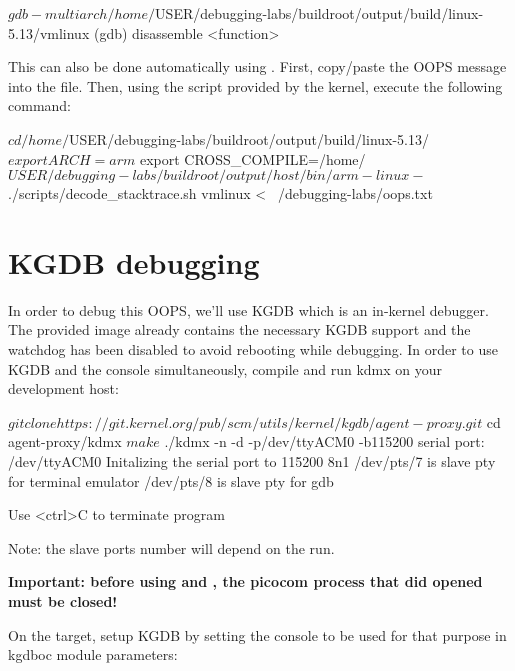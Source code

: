 \begin{bashinput}
$ gdb-multiarch /home/$USER/debugging-labs/buildroot/output/build/linux-5.13/vmlinux
(gdb) disassemble <function>
\end{bashinput}

This can also be done automatically using . First,
copy/paste the OOPS message into the  file.
Then, using the script provided by the kernel, execute the following command:

\begin{bashinput}
$ cd /home/$USER/debugging-labs/buildroot/output/build/linux-5.13/
$ export ARCH=arm
$ export CROSS_COMPILE=/home/$USER/debugging-labs/buildroot/output/host/bin/arm-linux-
$ ./scripts/decode_stacktrace.sh vmlinux < ~/debugging-labs/oops.txt
\end{bashinput}

\section{KGDB debugging}
In order to debug this OOPS, we'll use KGDB which is an in-kernel debugger.
The provided image already contains the necessary KGDB support and the watchdog
has been disabled to avoid rebooting while debugging. In order to use KGDB and
the console simultaneously, compile and run kdmx on your development host:

\begin{bashinput}
$ git clone https://git.kernel.org/pub/scm/utils/kernel/kgdb/agent-proxy.git
$ cd agent-proxy/kdmx
$ make
$ ./kdmx -n -d -p/dev/ttyACM0 -b115200
serial port: /dev/ttyACM0
Initalizing the serial port to 115200 8n1
/dev/pts/7 is slave pty for terminal emulator
/dev/pts/8 is slave pty for gdb

Use <ctrl>C to terminate program
\end{bashinput}

Note: the slave ports number will depend on the run.

\textbf{Important: before using  and , the
picocom process that did opened  must be closed!}

On the target, setup KGDB by setting the console to be used for that purpose in
kgdboc module parameters:


